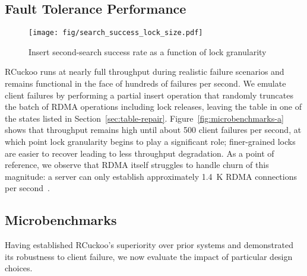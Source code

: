 \subsection{Fault Tolerance Performance}


\begin{figure}
\centering
        \texttt{[image: fig/search\_success\_lock\_size.pdf]}
\caption{Insert second-search success rate as a function of lock granularity}
             \label{fig:microbenchmarks-c}
\end{figure}

RCuckoo runs at nearly full throughput during realistic
failure scenarios and remains functional in the face of
hundreds of failures per second.
We emulate client failures by
performing a partial insert operation that randomly truncates the
batch of RDMA operations including lock releases, leaving the table
in one of the  states listed in
Section~\ref{sec:table-repair}.
Figure~\ref{fig:microbenchmarks-a} shows that
throughput remains high until about 500 client failures per second, at
which point lock granularity begins to play a significant role;
finer-grained locks are easier to recover leading to less throughput
degradation.
As a point of reference, we observe that RDMA itself struggles to handle churn of this magnitude:
a server can only
establish approximately 1.4~K RDMA connections per second~\cite{xrdma}.

\subsection{Microbenchmarks}
\label{ss:mb}

Having established RCuckoo's superiority over prior systems and
demonstrated its robustness to client failure, we now evaluate the
impact of particular design choices.





